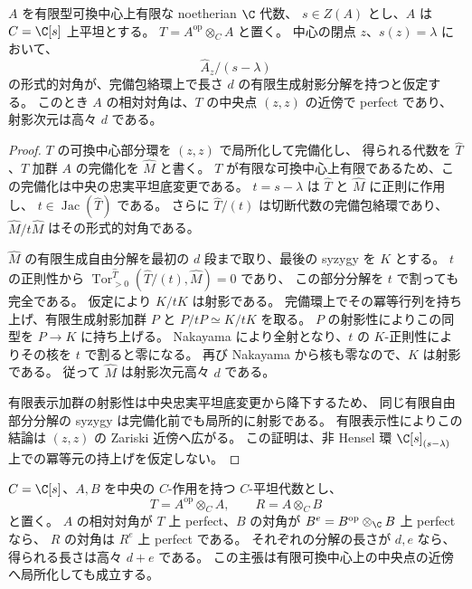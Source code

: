 \begin{lemma}[形式的中央ファイバーから相対対角への持上げ]
\label{cmo:lem:relative-diagonal-from-slice}
$A$ を有限型可換中心上有限な noetherian $\C$ 代数、
$s\in Z(A)$ とし、$A$ は $C=\C[s]$ 上平坦とする。
$T=A^{\mathrm{op}}\otimes_C A$ と置く。
中心の閉点 $z$、$s(z)=\lambda$ において、
\[
 \widehat A_z/(s-\lambda)
\]
の形式的対角が、完備包絡環上で長さ $d$ の有限生成射影分解を持つと仮定する。
このとき $A$ の相対対角は、$T$ の中央点 $(z,z)$ の近傍で perfect であり、
射影次元は高々 $d$ である。
\end{lemma}

\begin{proof}
$T$ の可換中心部分環を $(z,z)$ で局所化して完備化し、
得られる代数を $\widehat T$、$T$ 加群 $A$ の完備化を $\widehat M$ と書く。
$T$ が有限な可換中心上有限であるため、この完備化は中央の忠実平坦底変更である。
$t=s-\lambda$ は $\widehat T$ と $\widehat M$ に正則に作用し、
$t\in\operatorname{Jac}(\widehat T)$ である。
さらに $\widehat T/(t)$ は切断代数の完備包絡環であり、
$\widehat M/t\widehat M$ はその形式的対角である。

$\widehat M$ の有限生成自由分解を最初の $d$ 段まで取り、最後の syzygy を $K$ とする。
$t$ の正則性から $\operatorname{Tor}^{\widehat T}_{>0}(\widehat T/(t),\widehat M)=0$ であり、
この部分分解を $t$ で割っても完全である。
仮定により $K/tK$ は射影である。
完備環上でその冪等行列を持ち上げ、有限生成射影加群 $P$ と
$P/tP\simeq K/tK$ を取る。
$P$ の射影性によりこの同型を $P\to K$ に持ち上げる。
Nakayama により全射となり、$t$ の $K$-正則性によりその核を $t$ で割ると零になる。
再び Nakayama から核も零なので、$K$ は射影である。
従って $\widehat M$ は射影次元高々 $d$ である。

有限表示加群の射影性は中央忠実平坦底変更から降下するため、
同じ有限自由部分分解の syzygy は完備化前でも局所的に射影である。
有限表示性によりこの結論は $(z,z)$ の Zariski 近傍へ広がる。
この証明は、非 Hensel 環 $\C[s]_{(s-\lambda)}$ 上での冪等元の持上げを仮定しない。
\end{proof}

\begin{lemma}
\label{cmo:lem:mixed-relative-diagonal}
$C=\C[s]$、$A,B$ を中央の $C$-作用を持つ $C$-平坦代数とし、
\[
 T=A^{\mathrm{op}}\otimes_C A,\qquad R=A\otimes_C B
\]
と置く。
$A$ の相対対角が $T$ 上 perfect、$B$ の対角が
$B^e=B^{\mathrm{op}}\otimes_\C B$ 上 perfect なら、
$R$ の対角は $R^e$ 上 perfect である。
それぞれの分解の長さが $d,e$ なら、得られる長さは高々 $d+e$ である。
この主張は有限可換中心上の中央点の近傍へ局所化しても成立する。
\end{lemma}

